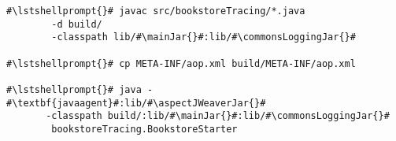 \begin{lstlisting}[caption=Commands to compile and run the Bookstore under \UnixLikeSystems, label=lst:traceAnalysisCompileRunExample1]
#\lstshellprompt{}# javac src/bookstoreTracing/*.java
        -d build/ 
        -classpath lib/#\mainJar{}#:lib/#\commonsLoggingJar{}#

#\lstshellprompt{}# cp META-INF/aop.xml build/META-INF/aop.xml

#\lstshellprompt{}# java -#\textbf{javaagent}#:lib/#\aspectJWeaverJar{}# 
       -classpath build/:lib/#\mainJar{}#:lib/#\commonsLoggingJar{}#
        bookstoreTracing.BookstoreStarter
\end{lstlisting}
